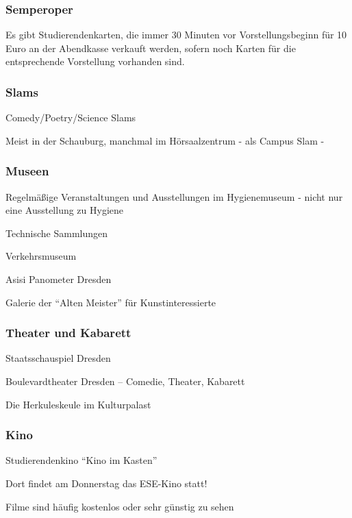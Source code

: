 \documentclass[a4paper,12pt]{scrreprt}
\begin{document}
\subsubsection{Semperoper}
\begin{itemize*}
    \item Es gibt Studierendenkarten, die immer 30 Minuten vor Vorstellungsbeginn für 10 Euro an der Abendkasse verkauft werden, sofern noch Karten für die entsprechende Vorstellung vorhanden sind.
\end{itemize*}

\subsubsection{Slams}
\begin{itemize*}
    \item Comedy/Poetry/Science Slams
    \item Meist in der Schauburg, manchmal im Hörsaalzentrum - als Campus Slam -
\end{itemize*}

\subsubsection{Museen}
\begin{itemize*}
    \item Regelmäßige Veranstaltungen und Ausstellungen im Hygienemuseum - nicht nur eine Ausstellung zu Hygiene
    \item Technische Sammlungen
    \item Verkehrsmuseum
    \item Asisi Panometer Dresden
    \item Galerie der \enquote{Alten Meister} für Kunstinteressierte
\end{itemize*}

\subsubsection{Theater und Kabarett}
\begin{itemize*}
    \item Staatsschauspiel Dresden
    \item Boulevardtheater Dresden -- Comedie, Theater, Kabarett
    \item Die Herkuleskeule im Kulturpalast
\end{itemize*}

\subsubsection{Kino}
\begin{itemize*}
    \item Studierendenkino \enquote{Kino im Kasten}
    \item Dort findet am Donnerstag das ESE-Kino statt!
    \item Filme sind häufig kostenlos oder sehr günstig zu sehen
\end{itemize*}
\end{document}
